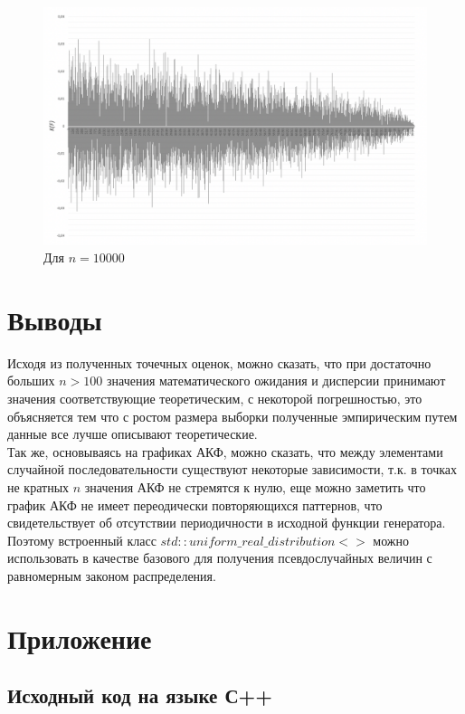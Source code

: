 \documentclass{article}
\begin{document}
\begin{enumerate}
				\begin{figure}[!htb]
					\includegraphics[scale=0.4]{4.png}
					\caption{Для $n = 10000$}
				\end{figure}		
		\end{enumerate}
	\FloatBarrier
	
	\clearpage
	\newpage
		
	\section{Выводы}
	Исходя из полученных точечных оценок, можно сказать, что при достаточно больших $n > 100$ значения математического ожидания и 
	дисперсии принимают значения соответствующие теоретическим, с некоторой погрешностью, это объясняется тем что с ростом размера 
	выборки полученные эмпирическим путем данные все лучше описывают теоретические.\\
	Так же, основываясь на графиках АКФ, можно сказать, что между элементами случайной последовательности существуют некоторые зависимости, 
	т.к. в точках не кратных $n$ значения АКФ не стремятся к нулю, еще можно заметить что график АКФ не имеет переодически повторяющихся 
	паттернов, что свидетельствует об отсутствии периодичности в исходной функции генератора. \\
	Поэтому встроенный класс $std::uniform\_real\_distribution<>$ можно использовать в качестве базового для получения псевдослучайных 
	величин с равномерным законом распределения.

	\newpage
	\section{Приложение}
	\subsection{Исходный код на языке С++}
	
	
	

		
\end{document}
